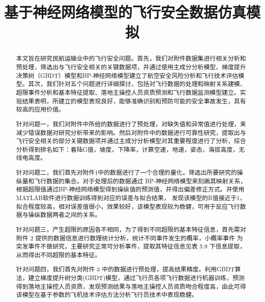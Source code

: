 \documentclass[UTF8]{ctexart}
\title{\textbf{基于神经网络模型的飞行安全数据仿真模拟}}%
\date{}%
\author{}%
\begin{document}
	\setcounter{page}{1}%
	\maketitle
	\vspace{-0.95cm}
	\thispagestyle{fancy}   
	\fancyhf{} %
	\renewcommand{\headrulewidth}{0pt} %
	\renewcommand{\abstractname}{\sihao 摘\quad 要} %
	\begin{abstract}\xiaosihao
		\vspace{0.1cm}
		本文旨在研究民航运输业中的飞行安全问题。首先，我们对附件数据集进行相关分析和预处理，筛选出与飞行安全相关的关键数据项，并通过使用主成分分析模型、梯度提升决策树（GBDT）模型和BP-神经网络模型建立了航空安全风险分析和飞行技术评估模型。其次，我们针对五个问题进行详细探讨，包括对飞行数据的处理和映射关系建模、超限事件分析和基本特征提取、落地主操控人员资质预测和飞行数据监测模型建立。实验结果表明，所建立的模型表现良好，能够准确识别和预防可能的安全事故发生，具有较高的应用价值。\par
		针对问题一，我们对附件中所给的数据进行了预处理，对缺失值和异常值进行处理，来减少错误数据对研究分析带来的影响。然后对附件中的数据进行可靠性研究，提取出与飞行安全相关的部分关键数据项并通过主成分分析模型对其重要程度进行了分析，综合分析得到排名如下：着陆G值，坡度，下降率，计算空速，地速，姿态，海拔高度，无线电高度。\par
		针对问题二，我们首先对附件1中的数据进行了一个合理的量化，筛选出所要研究的操纵量和飞行数据的集合。对于处理后的数据通过 BP-神经网络模型来刻画其映射关系，根据超限值通过BP-神经网络模型得到操纵值的预测值，并得出偏差修正方式。并使用MATLAB软件进行数据训练得到对应的误差与拟合结果， 发现该模型的R值接近于1，拟合程度较高，相对误差值很小，效果较好，该模型表现较为稳健，可用于反应飞行数据与操纵数据两者之间的关系。\par
		针对问题三，产生超限的原因各不相同，为了得到不同超限的基本特征信息，首先需对附件 2 提供的数据信息进行数理统计分析，统计不同事件发生的概率，小概率事件	为突发事件不做研究，主要研究正常可分析事件，提取其特征信息见表 5.9 下信息提取， 从而得出不同超限的基本特征。\par
		针对问题四，我们首先对附件 3 中的数据进行预处理，提高结果精度。利用GBDT算法，建立梯度提升树分类(GBDT)模型，通过飞行员各项飞行数据进行机器训练，预测得到落地主操控人员资质，发现预测结果与落地主操控人员资质吻合程度高，由此可得该模型在基于参数的飞机技术评估方法分析飞行员技术中表现稳健。\par

\end{abstract}
\end{document}
